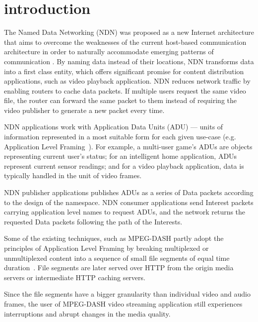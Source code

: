 \section{introduction} %
\label{sec:intro}
The Named Data Networking (NDN) was proposed as a new Internet architecture that aims to overcome the weaknesses of the current host-based communication architecture in order to naturally accommodate emerging patterns of communication \cite{ndn-conext,ndn-tr,NDN-CCR14}. By naming data instead of their locations, NDN transforms data into a first class entity, which offers significant promise for content distribution applications, such as video playback application. NDN reduces network traffic by enabling routers to cache data packets. If multiple users request the same video file, the router can forward the same packet to them instead of requiring the video publisher to generate a new packet every time. 

NDN applications work with Application Data Units (ADU) --- units of information represented in a most suitable form for each given use-case (e.g. Application Level Framing~\cite{Clark1990}). For example, a multi-user game's ADUs are objects representing current user's status; for an intelligent home application, ADUs represent current sensor readings; and for a video playback application, data is typically handled in the unit of video frames. 

NDN publisher applications publishes ADUs as a series of Data packets according to the design of the namespace. NDN consumer applications send Interest packets carrying application level names to request ADUs, and the network returns the requested Data packets following the path of the Interests. 

Some of the existing techniques, such as MPEG-DASH partly adopt the principles of Application Level Framing by breaking multiplexed or unmultiplexed content into a sequence of small file segments of equal time duration~\cite{stockhammer2011dynamic}. File segments are later served over HTTP from the origin media servers or intermediate HTTP caching servers. 

Since the file segments have a bigger granularity than individual video and audio frames, the user of MPEG-DASH video streaming application still experiences interruptions and abrupt changes in the media quality. 
 

